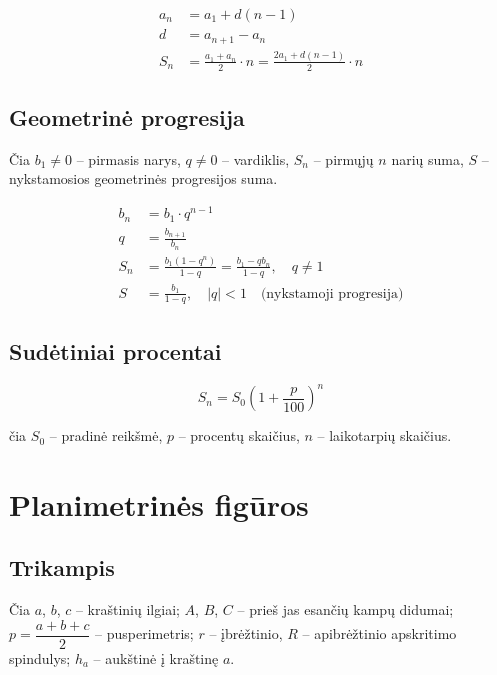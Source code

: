 \begin{align}
a_n &= a_1 + d(n-1) \\[6pt]
d   &= a_{n+1} - a_n \\[6pt]
S_n &= \frac{a_1 + a_n}{2} \cdot n = \frac{2a_1 + d(n-1)}{2} \cdot n
\end{align}

\subsection{Geometrinė progresija}

Čia $b_1 \neq 0$ – pirmasis narys, $q \neq 0$ – vardiklis, $S_n$ – pirmųjų $n$ narių
suma, $S$ – nykstamosios geometrinės progresijos suma.

\begin{align}
b_n &= b_1 \cdot q^{n-1} \\[6pt]
q   &= \frac{b_{n+1}}{b_n} \\[6pt]
S_n &= \frac{b_1(1 - q^n)}{1-q} = \frac{b_1 - q b_n}{1-q}, \quad q \neq 1 \\[6pt]
S   &= \frac{b_1}{1-q}, \quad |q| < 1 \quad \text{(nykstamoji progresija)}
\end{align}

\subsection{Sudėtiniai procentai}

\begin{tcolorbox}[colback=purple!5!white, colframe=purple!60!black, title=Sudėtinių procentų formulė]
\[
S_n = S_0 \left(1 + \frac{p}{100}\right)^n
\]
\end{tcolorbox}

čia $S_0$ – pradinė reikšmė, $p$ – procentų skaičius, $n$ – laikotarpių skaičius.

\section{Planimetrinės figūros}

\subsection{Trikampis}

Čia $a$, $b$, $c$ – kraštinių ilgiai; $A$, $B$, $C$ – prieš jas esančių kampų
didumai; $p = \dfrac{a+b+c}{2}$ – pusperimetris; $r$ – įbrėžtinio,
$R$ – apibrėžtinio apskritimo spindulys; $h_a$ – aukštinė į kraštinę $a$.

